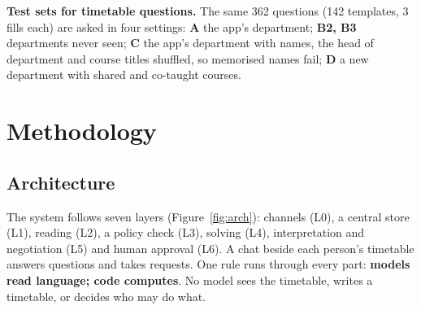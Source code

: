 \documentclass[11pt,a4paper]{article}
\begin{document}
\noindent\textbf{Test sets for timetable questions.} The same 362 questions (142 templates, 3 fills each) are asked
in four settings: \textbf{A} the app's department; \textbf{B2, B3} departments never seen; \textbf{C} the app's
department with names, the head of department and course titles shuffled, so memorised names fail; \textbf{D} a new
department with shared and co-taught courses.

\section{Methodology}
\label{sec:method}
\subsection{Architecture}
The system follows seven layers (Figure~\ref{fig:arch}): channels (L0), a central store (L1), reading (L2), a policy
check (L3), solving (L4), interpretation and negotiation (L5) and human approval (L6). A chat beside each person's
timetable answers questions and takes requests. One rule runs through every part: \textbf{models read language;
code computes}. No model sees the timetable, writes a timetable, or decides who may do what.
\end{document}

